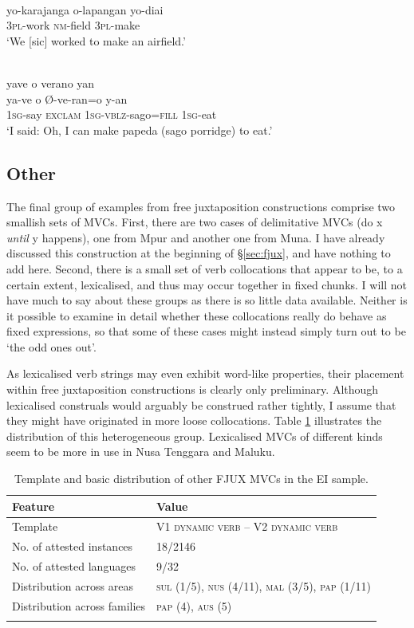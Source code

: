 \ea \label{Tobelo_16}
\\
\gll yo-karajanga o-lapangan yo-diai \\
3\textsc{pl}-work \textsc{nm}-field 3\textsc{pl}-make \\
\glft `We [sic] worked to make an airfield.' \\ 
\z

\ea \label{Dusner_4}
\\
\glll yave o verano yan \\
ya-ve o Ø-ve-ran=o y-an \\
1\textsc{sg}-say \textsc{exclam} 1\textsc{sg}-\textsc{vblz}-sago=\textsc{fill} 1\textsc{sg}-eat \\
\glft `I said: Oh, I can make papeda (sago porridge) to eat.'\\ 
\z

\subsection{Other}

The final group of examples from free juxtaposition constructions comprise two smallish sets of MVCs. First, there are two cases of delimitative MVCs (do x \textit{until} y happens), one from Mpur and another one from Muna. I have already discussed this construction at the beginning of §\ref{sec:fjux}, and have nothing to add here. Second, there is a small set of verb collocations that appear to be, to a certain extent, lexicalised, and thus may occur together in fixed chunks. I will not have much to say about these groups as there is so little data available. Neither is it possible to examine in detail whether these collocations really do behave as fixed expressions, so that some of these cases might instead simply turn out to be `the odd ones out'.

As lexicalised verb strings may even exhibit word-like properties, their placement within free juxtaposition constructions is clearly only preliminary. Although lexicalised construals would arguably be construed rather tightly, I assume that they might have originated in more loose collocations. Table \ref{table:other_fjux} illustrates the distribution of this heterogeneous group. Lexicalised MVCs of different kinds seem to be more in use in Nusa Tenggara and Maluku. 

\begin{table}
\begin{tabular}{ll}
\lsptoprule
Feature&Value\tabularnewline
\midrule
Template& V1 \textsc{dynamic verb} -- V2 \textsc{dynamic verb}\tabularnewline
No. of attested instances& 18/2146 \tabularnewline
No. of attested languages& 9/32 \tabularnewline
Distribution across areas& \textsc{sul} (1/5), \textsc{nus} (4/11), \textsc{mal} (3/5), \textsc{pap} (1/11) \tabularnewline
Distribution across families& \textsc{pap} (4), \textsc{aus} (5) \tabularnewline
\lspbottomrule
\end{tabular}
\caption[Template and basic distribution of other FJUX MVCs]{Template and basic distribution of other FJUX MVCs in the EI sample.}
\label{table:other_fjux}
\end{table}

